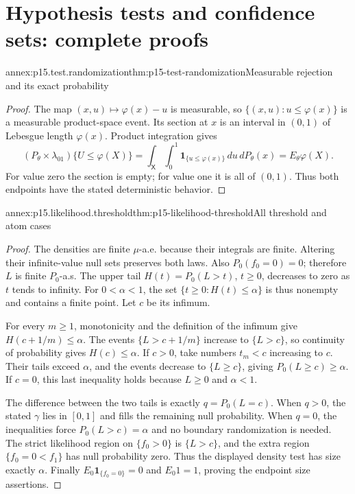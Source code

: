 \section{Hypothesis tests and confidence sets: complete proofs}
\label{sec:annex-p15-hypothesis-tests-confidence}

\begin{annexitem}{annex:p15.test.randomization}{thm:p15-test-randomization}{Measurable rejection and its exact probability}
\begin{proof}
The map \((x,u)\mapsto\varphi(x)-u\) is measurable, so
\(\{(x,u):u\leq\varphi(x)\}\) is a measurable product-space
event. Its section at \(x\) is an interval in \((0,1)\)
of Lebesgue length \(\varphi(x)\). Product integration gives
\[
 (P_\theta\times\lambda_{01})\{U\leq\varphi(X)\}
             =\int_{\mathsf X}\int_0^1
                    \mathbf1_{\{u\leq\varphi(x)\}}\,du\,dP_\theta(x)
             =E_\theta\varphi(X).
\]
For value zero the section is empty; for value one it is
all of \((0,1)\). Thus both endpoints have the stated
deterministic behavior.
\end{proof}
\end{annexitem}

\begin{annexitem}{annex:p15.likelihood.threshold}{thm:p15-likelihood-threshold}{All threshold and atom cases}
\begin{proof}
The densities are finite \(\mu\)-a.e. because their
integrals are finite. Altering their infinite-value
null sets preserves both laws. Also \(P_0(f_0=0)=0\);
therefore \(L\) is finite \(P_0\)-a.s.
The upper tail \(H(t)=P_0(L>t)\), \(t\geq0\),
decreases to zero as \(t\) tends to infinity.
For \(0<\alpha<1\), the set
\(\{t\geq0:H(t)\leq\alpha\}\) is thus nonempty
and contains a finite point. Let \(c\) be its infimum.

For every \(m\geq1\), monotonicity and the definition
of the infimum give \(H(c+1/m)\leq\alpha\).
The events \(\{L>c+1/m\}\) increase to \(\{L>c\}\),
so continuity of probability gives \(H(c)\leq\alpha\).
If \(c>0\), take numbers \(t_m<c\) increasing to
\(c\). Their tails exceed \(\alpha\), and the
events decrease to \(\{L\geq c\}\), giving
\(P_0(L\geq c)\geq\alpha\).
If \(c=0\), this last inequality holds because
\(L\geq0\) and \(\alpha<1\).

The difference between the two tails is exactly
\(q=P_0(L=c)\). When \(q>0\), the stated
\(\gamma\) lies in \([0,1]\) and fills the
remaining null probability. When \(q=0\),
the inequalities force \(P_0(L>c)=\alpha\)
and no boundary randomization is needed.
The strict likelihood region on \(\{f_0>0\}\)
is \(\{L>c\}\), and the extra region
\(\{f_0=0<f_1\}\) has null probability zero.
Thus the displayed density test has size
exactly \(\alpha\).
Finally \(E_0\mathbf1_{\{f_0=0\}}=0\)
and \(E_0 1=1\), proving the endpoint
size assertions.
\end{proof}
\end{annexitem}


